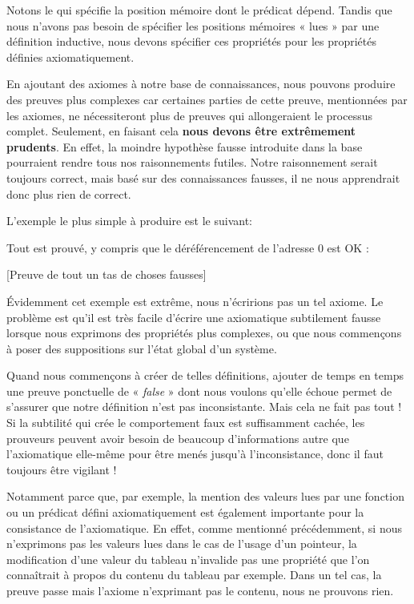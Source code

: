 

Notons le  qui spécifie la position mémoire dont le
prédicat dépend. Tandis que nous n'avons pas besoin de spécifier les positions
mémoires « lues » par une définition inductive, nous devons spécifier ces propriétés
pour les propriétés définies axiomatiquement.




En ajoutant des axiomes à notre base de connaissances, nous pouvons produire des
preuves plus complexes car certaines parties de cette preuve, mentionnées par
les axiomes, ne nécessiteront plus de preuves qui allongeraient le processus
complet. Seulement, en faisant cela \textbf{nous devons être extrêmement prudents}.
En effet, la moindre hypothèse fausse introduite dans la base pourraient rendre
tous nos raisonnements futiles. Notre raisonnement serait toujours correct, mais
basé sur des connaissances fausses, il ne nous apprendrait donc plus rien de correct.



L'exemple le plus simple à produire est le suivant:






Tout est prouvé, y compris que le déréférencement de l'adresse 0 est OK :



[Preuve de tout un tas de choses fausses]


Évidemment cet exemple est extrême, nous n'écririons pas un tel axiome. Le
problème est qu'il est très facile d'écrire une axiomatique subtilement fausse
lorsque nous exprimons des propriétés plus complexes, ou que nous commençons à
poser des suppositions sur l'état global d'un système.



Quand nous commençons à créer de telles définitions, ajouter de temps en
temps une preuve ponctuelle de « \textit{false} » dont nous voulons qu'elle échoue permet
de s'assurer que notre définition n'est pas inconsistante. Mais cela ne fait pas
tout ! Si la subtilité qui crée le comportement faux est suffisamment cachée, les
prouveurs peuvent avoir besoin de beaucoup d'informations autre que l'axiomatique
elle-même pour être menés jusqu'à l'inconsistance, donc il faut toujours être
vigilant !



Notamment parce que, par exemple, la mention des valeurs lues par une fonction
ou un prédicat défini axiomatiquement est également importante pour la
consistance de l'axiomatique. En effet, comme mentionné précédemment, si nous
n'exprimons pas les valeurs lues dans le cas de l'usage d'un pointeur, la
modification d'une valeur du tableau n'invalide pas une propriété que l'on
connaîtrait à propos du contenu du tableau par exemple. Dans un tel cas, la
preuve passe mais l'axiome n'exprimant pas le contenu, nous ne prouvons rien.



